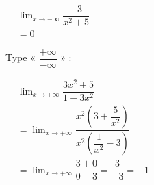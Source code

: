 {\begin{tasks}
\( \begin{aligned}
&\lim_{x \to -\infty} \dfrac{-3}{x^2 + 5} \\
&= 0
\end{aligned} \)

\task Type « $\dfrac{+\infty}{-\infty}$ » :

\( \begin{aligned}
&\lim_{x \to +\infty} \dfrac{3x^2 + 5}{1 - 3x^2} \\
&= \lim_{x \to +\infty} \dfrac{x^2\left(3 + \dfrac{5}{x^2}\right)}{x^2\left(\dfrac{1}{x^2} - 3\right)} \\
&= \lim_{x \to +\infty} \dfrac{3 + 0}{0 - 3} = \dfrac{3}{-3} = -1
\end{aligned} \)

\end{tasks}
}

